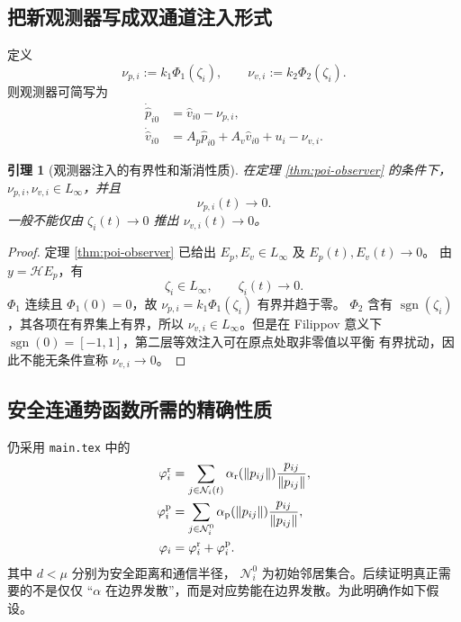 \documentclass[UTF8,a4paper,12pt]{ctexart}
\newtheorem{lemma}{引理}
\newcommand{\sgn}{\operatorname{sgn}}
\newcommand{\norm}[1]{\left\lVert #1\right\rVert}
\newcommand{\cH}{\mathcal H}
\begin{document}
\subsection{把新观测器写成双通道注入形式}

定义
\begin{equation}
  \nu_{p,i}:=k_1\Phi_1(\zeta_i),\qquad
  \nu_{v,i}:=k_2\Phi_2(\zeta_i).
  \label{eq:two-injections}
\end{equation}
则观测器可简写为
\begin{equation}
\begin{aligned}
  \dot{\hat p}_{i0}&=\hat v_{i0}-\nu_{p,i},\\
  \dot{\hat v}_{i0}&=A_p\hat p_{i0}+A_v\hat v_{i0}
  +u_i-\nu_{v,i}.
\end{aligned}
\label{eq:observer-two-injections}
\end{equation}

\begin{lemma}[观测器注入的有界性和渐消性质]
\label{lem:injection-properties}
在定理 \ref{thm:poi-observer} 的条件下，
$\nu_{p,i},\nu_{v,i}\in L_\infty$，并且
\begin{equation}
  \nu_{p,i}(t)\to0.
  \label{eq:position-injection-vanish}
\end{equation}
一般不能仅由 $\zeta_i(t)\to0$ 推出
$\nu_{v,i}(t)\to0$。
\end{lemma}

\begin{proof}
定理 \ref{thm:poi-observer} 已给出 $E_p,E_v\in L_\infty$ 及
$E_p(t),E_v(t)\to0$。
由 $y=\cH E_p$，有
\begin{equation}
  \zeta_i\in L_\infty,\qquad \zeta_i(t)\to0.
\end{equation}
$\Phi_1$ 连续且 $\Phi_1(0)=0$，故
$\nu_{p,i}=k_1\Phi_1(\zeta_i)$ 有界并趋于零。
$\Phi_2$ 含有 $\sgn(\zeta_i)$，其各项在有界集上有界，所以
$\nu_{v,i}\in L_\infty$。但是在 Filippov 意义下
$\sgn(0)=[-1,1]$，第二层等效注入可在原点处取非零值以平衡
有界扰动，因此不能无条件宣称 $\nu_{v,i}\to0$。
\end{proof}

\subsection{安全连通势函数所需的精确性质}

仍采用 \texttt{main.tex} 中的
\begin{equation}
\begin{aligned}
 \varphi_i^{\rm r}
 &=\sum_{j\in\mathcal N_i(t)}
 \alpha_{\rm r}(\norm{p_{ij}})\frac{p_{ij}}{\norm{p_{ij}}},\\
 \varphi_i^{\rm p}
 &=\sum_{j\in\mathcal N_i^0}
 \alpha_{\rm p}(\norm{p_{ij}})\frac{p_{ij}}{\norm{p_{ij}}},\\
 \varphi_i&=\varphi_i^{\rm r}+\varphi_i^{\rm p}.
\end{aligned}
\label{eq:new-apf}
\end{equation}
其中 $d<\mu$ 分别为安全距离和通信半径，
$\mathcal N_i^0$ 为初始邻居集合。后续证明真正需要的不是仅仅
``$\alpha$ 在边界发散''，而是对应势能在边界发散。为此明确作如下假设。
\end{document}
